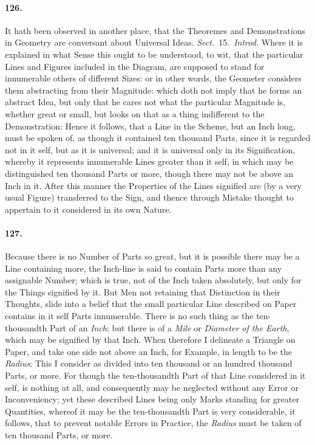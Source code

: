 \documentclass[]{article}
\newenvironment{sectionbody}{}{}
\begin{document}
\begin{sectionbody}
\paragraph{126.} It hath been observed in another place, that the Theoremes and
Demonstrations in Geometry are conversant about Universal Ideas.
\emph{Sect.}~15.\ \emph{Introd.}
Where it is explained in what Sense this ought to be understood,
to wit, that the particular Lines and Figures included in the
Diagram, are supposed to stand for innumerable others of
different Sizes: or in other words, the Geometer considers them
abstracting from their Magnitude: which doth not imply that he
forms an abstract Idea, but only that he cares not what the
particular Magnitude is, whether great or small, but looks on
that as a thing indifferent to the Demonstration: Hence it
follows, that a Line in the Scheme, but an Inch long, must be
spoken of, as though it contained ten thousand Parts, since it is
regarded not in it self, but as it is universal; and it is
universal only in its Signification, whereby it represents
innumerable Lines greater than it self, in which may be
distinguished ten thousand Parts or more, though there may not be
above an Inch in it.  After this manner the Properties of the
Lines signified are (by a very usual Figure) transferred to the
Sign, and thence through Mistake thought to appertain to it
considered in its own Nature.



\paragraph{127.} Because there is no Number of Parts so great, but it is possible
there may be a Line containing more, the Inch-line is said to
contain Parts more than any assignable Number; which is true, not
of the Inch taken absolutely, but only for the Things signified
by it.  But Men not retaining that Distinction in their Thoughts,
slide into a belief that the small particular Line described on
Paper contains in it self Parts innumerable.  There is no such
thing as the ten-thousandth Part of an \emph{Inch}; but there
is of a \emph{Mile} or \emph{Diameter of the Earth}, which
may be signified by that Inch.  When therefore I delineate a
Triangle on Paper, and take one side not above an Inch, for
Example, in length to be the \emph{Radius}: This I consider as
divided into ten thousand or an hundred thousand Parts, or more.
For though the ten-thousandth Part of that Line considered in it
self, is nothing at all, and consequently may be neglected
without any Error or Inconveniency; yet these described Lines
being only Marks standing for greater Quantities, whereof it may
be the ten-thousandth Part is very considerable, it follows, that
to prevent notable Errors in Practice, the \emph{Radius} must
be taken of ten thousand Parts, or more.




\end{sectionbody}
\end{document}
